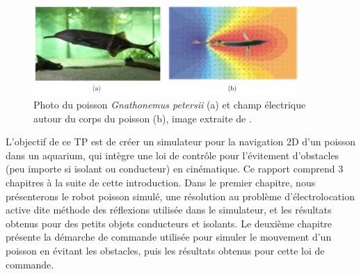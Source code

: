 \begin{figure}[h!]
    \centering
    \includegraphics[width=0.9\textwidth]{doc/img/poisson_champ.png}
    \caption{\centering Photo du poisson \textit{Gnathonemus petersii} (a) et champ électrique autour du corps du poisson (b), image extraite de \cite{BENACHENHOU2014}.}
    \label{fig:poisson_champ}
\end{figure}

L'objectif de ce TP est de créer un simulateur pour la navigation 2D d'un poisson dans un aquarium, qui intègre une loi de contrôle pour l'évitement d'obstacles (peu importe si isolant ou conducteur) en cinématique. 
Ce rapport comprend 3 chapitres à la suite de cette introduction. Dans le premier chapitre, nous présenterons le robot poisson simulé, une résolution au problème d'électrolocation active dite \og méthode des réflexions \fg{} utilisée dans le simulateur, et les résultats obtenus pour des petits objets conducteurs et isolants. Le deuxième chapitre présente la démarche de commande utilisée pour simuler le mouvement d'un poisson en évitant les obstacles, puis les résultats obtenus pour cette loi de commande. 

